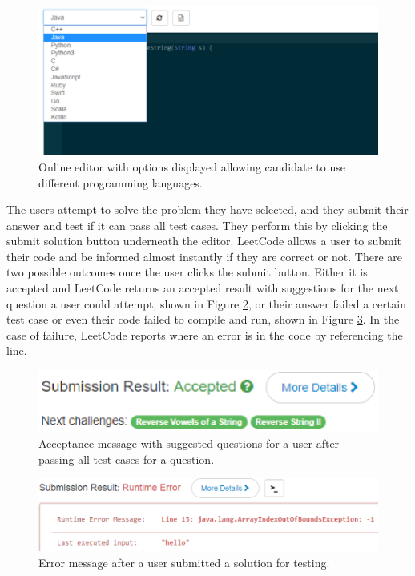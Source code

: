 \documentclass[conference]{IEEEtran}
\begin{document}
\begin{figure}[h]
\includegraphics[scale=0.4]{languageUI}
\caption{Online editor with options displayed allowing candidate to use different programming languages.}
\label{fig:langUI}
\end{figure}   
The users attempt to solve the problem they have selected, and they submit their answer and test if it can pass all test cases. They perform this by clicking the submit solution button underneath the editor. LeetCode allows a user to submit their code and be informed almost instantly if they are correct or not. There are two possible outcomes once the user clicks the submit button. Either it is accepted and LeetCode returns an accepted result with suggestions for the next question a user could attempt, shown in Figure \ref{fig:accepted}, or their answer failed a certain test case or even their code failed to compile and run, shown in Figure \ref{fig:fail}. In the case of failure, LeetCode reports where an error is in the code by referencing the line.  
\begin{figure}[h]
\includegraphics[scale=0.4]{accepted}
\caption{Acceptance message with suggested questions for a user after passing all test cases for a question.}
\label{fig:accepted}
\end{figure}  
\begin{figure}[h]
\includegraphics[scale=0.4]{failure}
\caption{Error message after a user submitted a solution for testing.}
\label{fig:fail}
\end{figure}    
\end{document}
